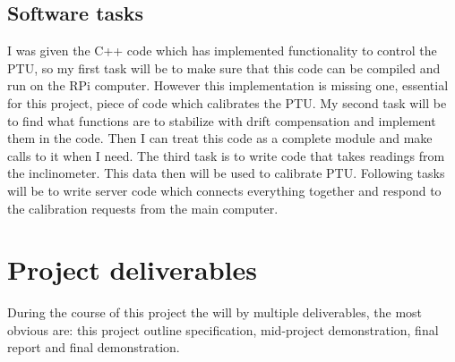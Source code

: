 \documentclass[11pt,fleqn,twoside]{article}
\begin{document}
\subsection{Software tasks}
I was given the C++ code which has implemented functionality to control the PTU, so my first task will be to make sure that this code can be compiled and run on the RPi computer. However this implementation is missing one, essential for this project, piece of code which calibrates the PTU. My second task will be to find what functions are to stabilize with drift compensation and implement them in the code. Then I can treat this code as a complete module and make calls to it when I need. The third task is to write code that takes readings from the inclinometer. This data then will be used to calibrate PTU. Following tasks will be to write server code which connects everything together and respond to the calibration requests from the main computer.   
\section{Project deliverables}

During the course of this project the will by multiple deliverables, the most obvious are: this project outline specification, mid-project demonstration, final report and final demonstration.
\end{document}
